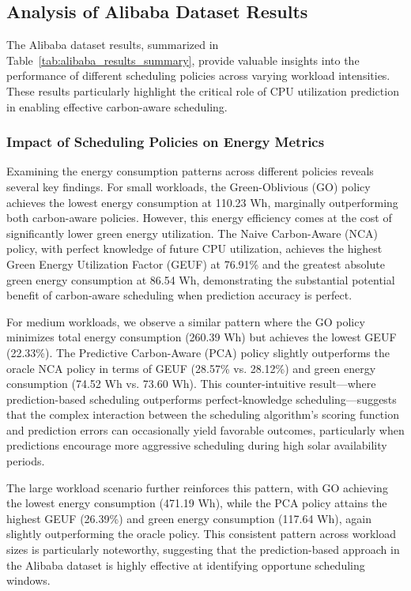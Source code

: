 \subsection{Analysis of Alibaba Dataset Results}
\label{subsec:alibaba_results}

The Alibaba dataset results, summarized in Table~\ref{tab:alibaba_results_summary}, provide valuable insights into the performance of different scheduling policies across varying workload intensities. These results particularly highlight the critical role of CPU utilization prediction in enabling effective carbon-aware scheduling.

\subsubsection{Impact of Scheduling Policies on Energy Metrics}

Examining the energy consumption patterns across different policies reveals several key findings. For small workloads, the Green-Oblivious (GO) policy achieves the lowest energy consumption at 110.23 Wh, marginally outperforming both carbon-aware policies. However, this energy efficiency comes at the cost of significantly lower green energy utilization. The Naive Carbon-Aware (NCA) policy, with perfect knowledge of future CPU utilization, achieves the highest Green Energy Utilization Factor (GEUF) at 76.91\% and the greatest absolute green energy consumption at 86.54 Wh, demonstrating the substantial potential benefit of carbon-aware scheduling when prediction accuracy is perfect.

For medium workloads, we observe a similar pattern where the GO policy minimizes total energy consumption (260.39 Wh) but achieves the lowest GEUF (22.33\%). The Predictive Carbon-Aware (PCA) policy slightly outperforms the oracle NCA policy in terms of GEUF (28.57\% vs. 28.12\%) and green energy consumption (74.52 Wh vs. 73.60 Wh). This counter-intuitive result—where prediction-based scheduling outperforms perfect-knowledge scheduling—suggests that the complex interaction between the scheduling algorithm's scoring function and prediction errors can occasionally yield favorable outcomes, particularly when predictions encourage more aggressive scheduling during high solar availability periods.

The large workload scenario further reinforces this pattern, with GO achieving the lowest energy consumption (471.19 Wh), while the PCA policy attains the highest GEUF (26.39\%) and green energy consumption (117.64 Wh), again slightly outperforming the oracle policy. This consistent pattern across workload sizes is particularly noteworthy, suggesting that the prediction-based approach in the Alibaba dataset is highly effective at identifying opportune scheduling windows.

